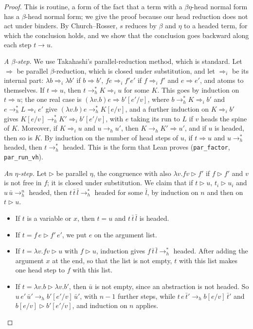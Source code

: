 \documentclass[a4paper,english]{lipics-v2021}
\newcommand{\hred}{\to_{h}}
\newcommand{\lean}[1]{\texttt{#1}}
\begin{document}
\begin{proof}
This is routine, a form of the fact that a term with a $\beta\eta$-head normal form has a $\beta$-head normal form; we give the proof because our head reduction does not act under binders. By Church--Rosser, $s$ reduces by $\beta$ and $\eta$ to a headed term, for which the conclusion holds, and we show that the conclusion goes backward along each step $t \to u$.

\emph{A $\beta$-step.} We use Takahashi's parallel-reduction method, which is standard. Let $\Rightarrow$ be parallel $\beta$-reduction, which is closed under substitution, and let $\Rightarrow_i$ be its internal part: $\lambda b \Rightarrow_i \lambda b'$ if $b \Rightarrow b'$, $fe \Rightarrow_i f'e'$ if $f \Rightarrow_i f'$ and $e \Rightarrow e'$, and atoms to themselves. If $t \Rightarrow u$, then $t \hred^* K \Rightarrow_i u$ for some $K$. This goes by induction on $t \Rightarrow u$; the one real case is $(\lambda v.b)e \Rightarrow b'[e'/v]$, where $b \hred^* K \Rightarrow_i b'$ and $e \hred^* L \Rightarrow_i e'$ give $(\lambda v.b)e \hred^* K[e/v]$, and a further induction on $K \Rightarrow_i b'$ gives $K[e/v] \hred^* K' \Rightarrow_i b'[e'/v]$, with $e$ taking its run to $L$ if $v$ heads the spine of $K$. Moreover, if $K \Rightarrow_i u$ and $u \hred u'$, then $K \hred K' \Rightarrow u'$, and if $u$ is headed, then so is $K$. By induction on the number of head steps of $u$, if $t \Rightarrow u$ and $u \hred^*$ headed, then $t \hred^*$ headed. This is the form that Lean proves (\lean{par\_factor}, \lean{par\_run\_vh}).

\emph{An $\eta$-step.} Let $\rhd$ be parallel $\eta$, the congruence with also $\lambda v.fv \rhd f'$ if $f \rhd f'$ and $v$ is not free in $f$; it is closed under substitution. We claim that if $t \rhd u$, $t_i \rhd u_i$ and $u\,\bar u \hred^n$ headed, then $t\,\bar t\,\bar l \hred^*$ headed for some $\bar l$, by induction on $n$ and then on $t \rhd u$.
\begin{itemize}
\item If $t$ is a variable or $x$, then $t = u$ and $t\,\bar t\,\bar l$ is headed.
\item If $t = f\,e \rhd f'\,e'$, we put $e$ on the argument list.
\item If $t = \lambda v.fv \rhd u$ with $f \rhd u$, induction gives $f\,\bar t\,\bar l \hred^*$ headed. After adding the argument $x$ at the end, so that the list is not empty, $t$ with this list makes one head step to $f$ with this list.
\item If $t = \lambda v.b \rhd \lambda v.b'$, then $\bar u$ is not empty, since an abstraction is not headed. So $u\,e'\,\bar u' \hred b'[e'/v]\,\bar u'$, with $n-1$ further steps, while $t\,e\,\bar t' \hred b[e/v]\,\bar t'$ and $b[e/v] \rhd b'[e'/v]$, and induction on $n$ applies.\qedhere
\end{itemize}
\end{proof}
\end{document}
